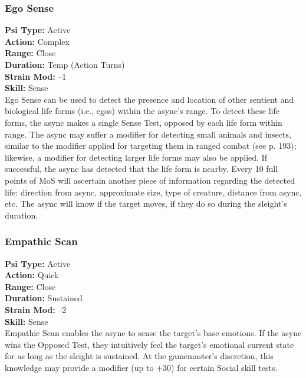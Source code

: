 \subsubsection{Ego Sense} \textbf{Psi Type:} Active \\ \textbf{Action:} Complex \\ \textbf{Range:} Close \\ \textbf{Duration:} Temp (Action Turns) \\ \textbf{Strain Mod:} –1 \\ \textbf{Skill:} Sense\\ Ego Sense can be used to detect the presence and location of other sentient and biological life forms (i.e., egos) within the async’s range. To detect these life forms, the async makes a single Sense Test, opposed by each life form within range. The async may suffer a modifier for detecting small animals and insects, similar to the modifier applied for targeting them in ranged combat (see p. 193); likewise, a modifier for detecting larger life forms may also be applied. If successful, the async has detected that the life form is nearby. Every 10 full points of MoS will ascertain another piece of information regarding the detected life: direction from async, approximate size, type of creature, distance from async, etc. The async will know if the target moves, if they do so during the sleight’s duration. 

\subsubsection{Empathic Scan} \textbf{Psi Type:} Active \\ \textbf{Action:} Quick \\ \textbf{Range:} Close \\ \textbf{Duration:} Sustained \\ \textbf{Strain Mod:} –2 \\ \textbf{Skill:} Sense\\ Empathic Scan enables the async to sense the target’s base emotions. If the async wins the Opposed Test, they intuitively feel the target’s emotional current state for as long as the sleight is sustained. At the gamemaster’s discretion, this knowledge may provide a modifier (up to +30) for certain Social skill tests. 

